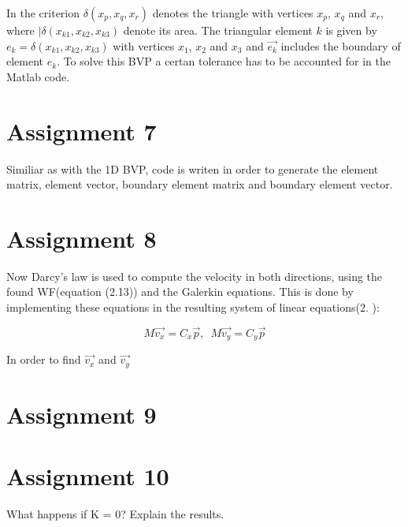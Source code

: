 \documentclass{report}
\begin{document}
In the criterion $\delta(x_p,x_q,x_r)$ denotes the triangle with vertices $x_p$, $x_q$ and $x_r$, where $|\delta(x_{k1},x_{k2},x_{k3})$ denote its area. The triangular element $k$ is given by $e_k=\delta(x_{k1},x_{k2},x_{k3})$ with vertices  $x_1$, $x_2$ and $x_3$ and $\vec{e_k}$ includes the boundary of element $e_k$. To solve this BVP a certan tolerance has to be accounted for in the Matlab code.

\section{Assignment 7}

Similiar as with the 1D BVP, code is writen in order to generate the element matrix, element vector, boundary element matrix and boundary element vector. 




\section{Assignment 8}

Now Darcy's law is used to compute the velocity in both directions, using the found WF(equation (2.13)) and the Galerkin equations. This is done by implementing these equations in the resulting system of linear equations(2. ):

\begin{equation}
 M\vec{v_x}=C_x\vec{p},\,\,\, M\vec{v_y}=C_y\vec{p}
\end{equation}

In order to find $\vec{v_x}$ and $\vec{v_y}$


\section{Assignment 9}


\section{Assignment 10}
What happens if K = 0? Explain the results.
\end{document}
